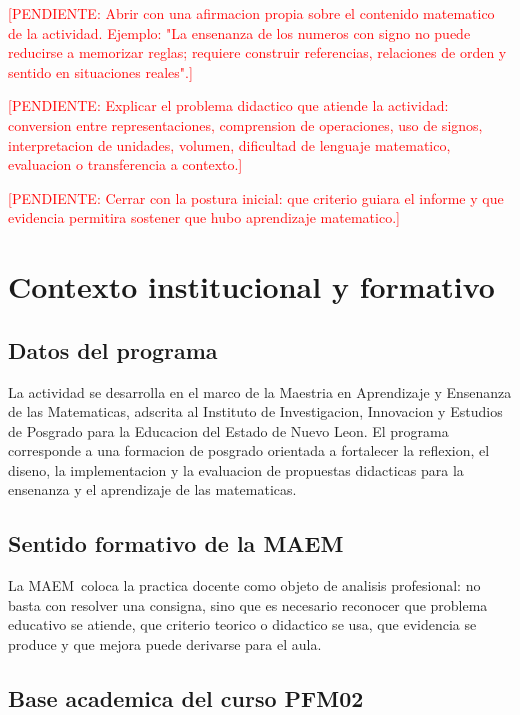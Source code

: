 \documentclass[
	spanish,
	letterpaper, oneside
]{article}
\def\universityname {Instituto de Investigacion, Innovacion y Estudios de Posgrado para la Educacion del Estado de Nuevo Leon}
\def\universityfaculty {Maestria en Aprendizaje y Ensenanza de las Matematicas}
\def\programshort {MAEM}
\newcommand{\pendiente}[1]{\textcolor{red}{[PENDIENTE: #1]}}
\begin{document}
\pendiente{Abrir con una afirmacion propia sobre el contenido matematico de la actividad. Ejemplo: "La ensenanza de los numeros con signo no puede reducirse a memorizar reglas; requiere construir referencias, relaciones de orden y sentido en situaciones reales".}

\pendiente{Explicar el problema didactico que atiende la actividad: conversion entre representaciones, comprension de operaciones, uso de signos, interpretacion de unidades, volumen, dificultad de lenguaje matematico, evaluacion o transferencia a contexto.}

\pendiente{Cerrar con la postura inicial: que criterio guiara el informe y que evidencia permitira sostener que hubo aprendizaje matematico.}

\section{Contexto institucional y formativo}

\subsection{Datos del programa}

La actividad se desarrolla en el marco de la \universityfaculty, adscrita al
\universityname. El programa corresponde a una formacion de posgrado orientada a
fortalecer la reflexion, el diseno, la implementacion y la evaluacion de
propuestas didacticas para la ensenanza y el aprendizaje de las matematicas.

\subsection{Sentido formativo de la MAEM}

La \programshort\ coloca la practica docente como objeto de analisis profesional:
no basta con resolver una consigna, sino que es necesario reconocer que problema
educativo se atiende, que criterio teorico o didactico se usa, que evidencia se
produce y que mejora puede derivarse para el aula.

\subsection{Base academica del curso PFM02}
\end{document}
